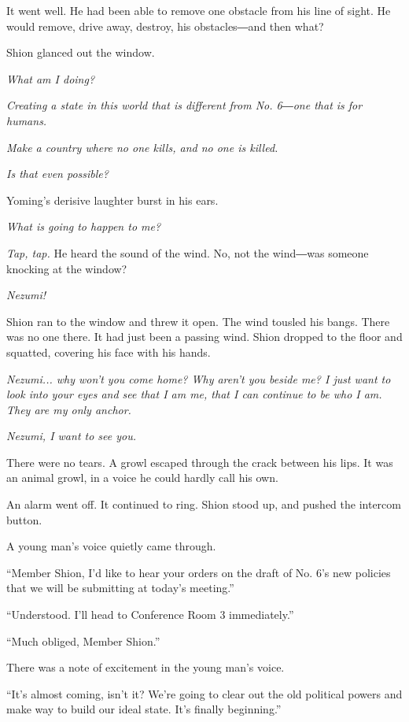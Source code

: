 It went well. He had been able to remove one obstacle from his line of
sight. He would remove, drive away, destroy, his obstacles―and then
what?

Shion glanced out the window.

\emph{What am I doing?}

\emph{Creating a state in this world that is different from No. 6―one that is
for humans.}

\emph{Make a country where no one kills, and no one is killed.}

\emph{Is that even possible?}

Yoming's derisive laughter burst in his ears.

\emph{What is going to happen to me?}

\myspace

\emph{Tap, tap.} He heard the sound of the wind. No, not the wind―was someone
knocking at the window?

\emph{Nezumi!}

Shion ran to the window and threw it open. The wind tousled his bangs.
There was no one there. It had just been a passing wind. Shion dropped
to the floor and squatted, covering his face with his hands.

\emph{Nezumi... why won't you come home? Why aren't you beside me? I just want
to look into your eyes and see that I am me, that I can continue to be
who I am. They are my only anchor.}

\emph{Nezumi, I want to see you.}

There were no tears. A growl escaped through the crack between his lips.
It was an animal growl, in a voice he could hardly call his own.

An alarm went off. It continued to ring. Shion stood up, and
pushed the intercom button.

A young man's voice quietly came through.

``Member Shion, I'd like to hear your orders on the draft of No. 6's new
policies that we will be submitting at today's meeting.''

``Understood. I'll head to Conference Room 3 immediately.''

``Much obliged, Member Shion.''

There was a note of excitement in the young man's voice.

``It's almost coming, isn't it? We're going to clear out the old
political powers and make way to build our ideal state. It's finally
beginning.''

